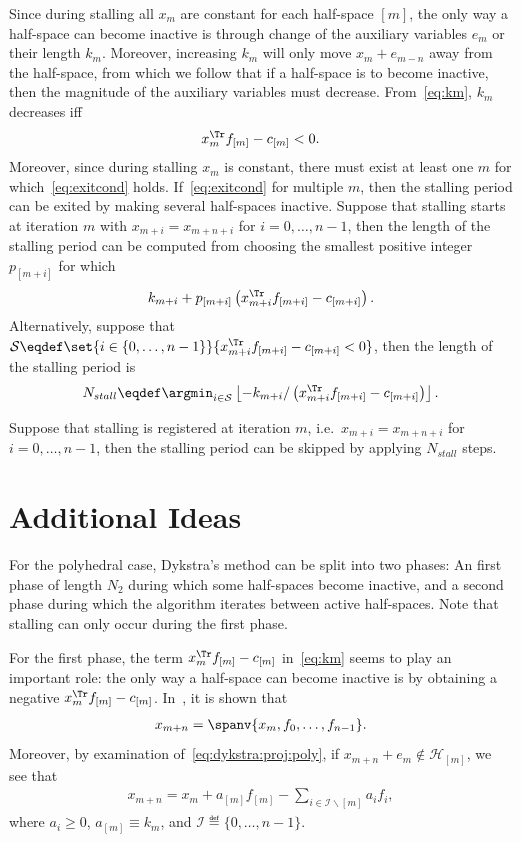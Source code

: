 \documentclass[hidelinks]{article}
\begin{document}
Since during stalling all $x_m$ are constant for each half-space $[m]$, the only way a half-space can become inactive is through change of the auxiliary variables $e_m$ or their length $k_m$. Moreover, increasing $k_m$ will only move $x_m+e_{m-n}$ away from the half-space, from which we follow that if a half-space is to become inactive, then the magnitude of the auxiliary variables must decrease. From~\eqref{eq:km}, $k_m$ decreases iff
\begin{align}\label{eq:exitcond}
x_m^\Tr f_{[m]} - c_{[m]} < 0.
\end{align}
Moreover, since during stalling $x_m$ is constant, there must exist at least one $m$ for which~\eqref{eq:exitcond} holds. If~\eqref{eq:exitcond} for multiple $m$, then the stalling period can be exited by making several half-spaces inactive. Suppose that stalling starts at iteration $m$ with $x_{m+i}=x_{m+n+i}$ for $i=0,\dots,n-1$, then the length of the stalling period can be computed from choosing the smallest positive integer $p_{[m+i]}$ for which
\begin{align}
k_{m+i}+p_{[m+i]}\left(x_{m+i}^\Tr f_{[m+i]} - c_{[m+i]}\right).
\end{align}
Alternatively, suppose that $\mathcal{S}\eqdef\set{i\in\lbrace 0,\dots,n-1\rbrace}{x_{m+i}^\Tr f_{[m+i]} - c_{[m+i]}<0}$, then the length of the stalling period is
\begin{align}
N_{stall}\eqdef\argmin_{i\in\mathcal{S}} \left\lfloor -k_{m+i} / \left(x_{m+i}^\Tr f_{[m+i]} - c_{[m+i]}\right)\right\rfloor.
\end{align}

Suppose that stalling is registered at iteration $m$, i.e.\ $x_{m+i}=x_{m+n+i}$ for $i=0,\dots,n-1$, then the stalling period can be skipped by applying $N_{stall}$ steps.

\section{Additional Ideas}

For the polyhedral case, Dykstra's method can be split into two phases: An first phase of length $N_2$ during which some half-spaces become inactive, and a second phase during which the algorithm iterates between active half-spaces. Note that stalling can only occur during the first phase.

For the first phase, the term $x_m^\Tr f_{[m]} - c_{[m]}$ in~\eqref{eq:km} seems to play an important role: the only way a half-space can become inactive is by obtaining a negative $x_m^\Tr f_{[m]} - c_{[m]}$. In~\cite{DYKSTRAPERKINS}, it is shown that
\begin{align}
x_{m+n} =\spanv{x_m, f_0,\dots,f_{n-1}}.
\end{align}
Moreover, by examination of~\eqref{eq:dykstra:proj:poly}, if $x_{m+n}+e_m\not\in\mathcal{H}_{[m]}$, we see that
\begin{align}
x_{m+n} =x_m + a_{[m]}f_{[m]}-\sum_{i\in \mathcal{I} \backslash [m]} a_i f_i,
\end{align}
where $a_i\geq 0$, $a_{[m]}\equiv k_m$, and $\mathcal{I}\eqdef \lbrace 0,\dots,n-1\rbrace$.

% 

\end{document}
